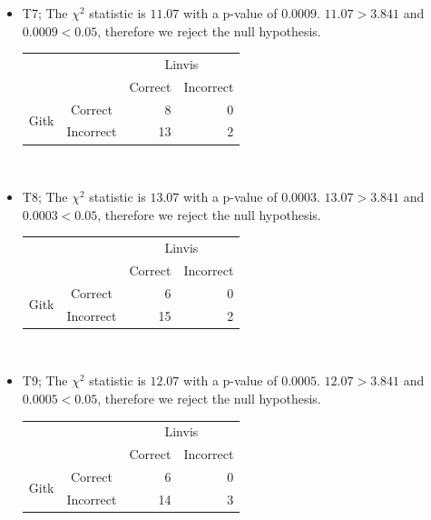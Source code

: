 \begin{itemize}
  \item

    T7; The $\chi^2$ statistic is $11.07$ with a p-value of $0.0009$.
    $11.07 > 3.841$ and $0.0009 < 0.05$, therefore we reject the null
    hypothesis.

    \begin{tabular}{cc|rr}
                            &           & \multicolumn{2}{c}{Linvis}\\
                            &           & Correct                      & Incorrect\\\hline
      \multirow{2}{*}{Gitk} & Correct   & 8                            & 0\\
                            & Incorrect & 13                           & 2\\
    \end{tabular}\\



  \item

    T8; The $\chi^2$ statistic is $13.07$ with a p-value of $0.0003$.
    $13.07 > 3.841$ and $0.0003 < 0.05$, therefore we reject the null
    hypothesis.

    \begin{tabular}{cc|rr}
                            &           & \multicolumn{2}{c}{Linvis}\\
                            &           & Correct                      & Incorrect\\\hline
      \multirow{2}{*}{Gitk} & Correct   & 6                            & 0\\
                            & Incorrect & 15                           & 2\\
    \end{tabular}\\

  \item

    T9; The $\chi^2$ statistic is $12.07$ with a p-value of $0.0005$.
    $12.07 > 3.841$ and $0.0005 < 0.05$, therefore we reject the null
    hypothesis.

    \begin{tabular}{cc|rr}
      &           & \multicolumn{2}{c}{Linvis}\\
      &           & Correct                      & Incorrect\\\hline
      \multirow{2}{*}{Gitk}  & Correct   & 6                            & 0\\
      & Incorrect & 14                           & 3\\
    \end{tabular}


\end{itemize}
